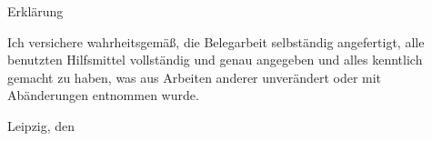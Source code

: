 \thispagestyle{empty}
\begin{center}
\large \lsstyle Erklärung
\end{center}
\vspace{1.5cm}
{\doublespacing
Ich versichere wahrheitsgemäß, die Belegarbeit selbständig angefertigt, alle benutzten Hilfsmittel vollständig und genau angegeben und alles kenntlich gemacht zu haben, was aus Arbeiten anderer unverändert oder mit Abänderungen entnommen wurde.}\par
\vspace{2cm}
\noindent
\begin{minipage}[t]{6.5cm}
\dotfill

\onehalfspacing
\autor

Leipzig, den \datum
\end{minipage}\par
\vspace{2.5cm}

\iffalse %
\begin{minipage}[t]{6.5cm}
\dotfill

\onehalfspacing
\autorII

Leipzig, den \datum
\end{minipage}\par
\vspace{2.5cm}

\fi %

\iffalse %

\begin{minipage}[t]{6.5cm}
\dotfill

\onehalfspacing
\autorIII

Leipzig, den \datum
\end{minipage}\par

\fi  %

\clearpage

